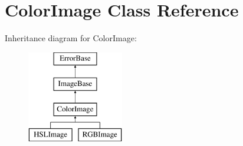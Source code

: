 \hypertarget{classColorImage}{
\section{ColorImage Class Reference}
\label{classColorImage}
}
Inheritance diagram for ColorImage:\begin{figure}[H]
\begin{center}
\leavevmode
\includegraphics[height=4.000000cm]{classColorImage}
\end{center}
\end{figure}
